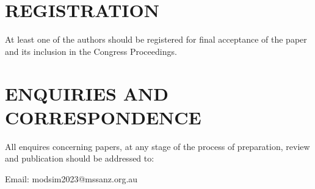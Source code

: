 \documentclass[a4paper,fleqn]{article} %
\begin{document}
\section{REGISTRATION}

At least one of the authors should be registered for final acceptance of the paper and its inclusion in the Congress Proceedings.

\section{ENQUIRIES AND CORRESPONDENCE}
All enquires concerning papers, at any stage of the process of preparation, review and publication should be addressed to: \par

Email: modsim2023@mssanz.org.au\\
	
\end{document}
